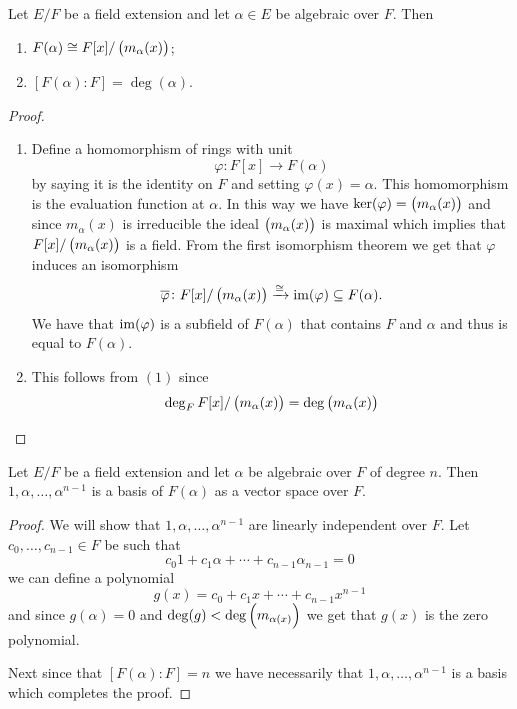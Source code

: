 \documentclass[11pt,a4paper]{article}
\begin{document}
\begin{proposition}
  Let $E/F$ be a field extension
  and let $\alpha \in E$ be algebraic over $F$.
  Then
  \begin{enumerate}
    \item[(1)] $F(\alpha) \cong F[x]/\del{m_{\alpha}(x)}$;
    \item[(2)] $[F(\alpha) : F] = \deg(\alpha)$.
  \end{enumerate}
\end{proposition}
\begin{proof} \phantom{}
\begin{enumerate}
  \item[(1)] Define a homomorphism of rings with unit
    \[
      \varphi \colon F[x] \to F(\alpha)
    \]
    by saying it is the identity on $F$ and setting $\varphi(x) = \alpha$.
    This homomorphism is the evaluation function at $\alpha$.
    In this way we have $\ker(\varphi) = \del{m_{\alpha}(x)}$
    and since $m_{\alpha}(x)$ is irreducible the ideal
    $\del{m_{\alpha}(x)}$ is maximal which implies that
    $F[x]/\del{m_{\alpha}(x)}$ is a field.
    From the first isomorphism theorem we get that $\varphi$ induces
    an isomorphism
    \[
      \overline \varphi \colon F[x]/\del{m_{\alpha}(x)}
      \taking{\cong} \im(\varphi) \subseteq F(\alpha).
    \]
    We have that $\operatorname{im}(\varphi)$ is a subfield of $F(\alpha)$ that
    contains $F$ and $\alpha$ and thus is equal to $F(\alpha)$.
  \item[(2)] This follows from $(1)$ since
    \[
      \deg_F F[x]/\del{m_{\alpha}(x)} = \deg\del{m_{\alpha}(x)}
    \]
\end{enumerate}
\end{proof}

\begin{corollary}
  Let $E/F$ be a field extension and let $\alpha$ be algebraic over $F$
  of degree $n$.
  Then $1,\alpha,\dots,\alpha^{n-1}$ is a basis of $F(\alpha)$ as a vector space
  over $F$.
\end{corollary}
\begin{proof}
  We will show that $1,\alpha,\dots,\alpha^{n-1}$ are linearly independent
  over $F$.
  Let $c_0,\dots,c_{n-1} \in F$ be such that
  \[
    c_0 1 + c_1 \alpha + \cdots + c_{n-1} \alpha_{n-1} = 0
  \]
  we can define a polynomial
  \[
    g(x) = c_0 + c_1 x + \cdots + c_{n-1} x^{n-1}
  \]
  and since $g(\alpha) = 0$ and $\deg(g) < \deg\del{m_{\alpha(x)}}$
  we get that $g(x)$ is the zero polynomial.

  Next since that $[F(\alpha) : F] = n$
  we have necessarily that $1,\alpha,\dots,\alpha^{n-1}$ is a basis
  which completes the proof.
\end{proof}
\end{document}

